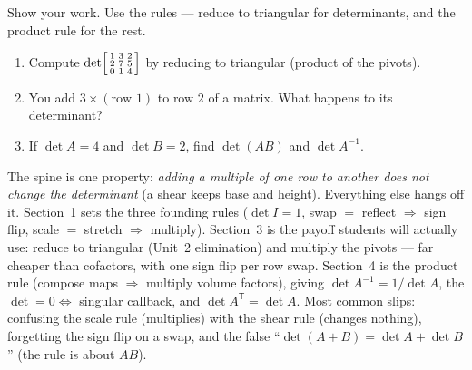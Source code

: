 \documentclass[10pt]{article}
\newcommand{\T}{\mathsf{T}}
\begin{document}
\begin{practicebox}
Show your work. Use the rules --- reduce to triangular for determinants, and the product rule for the rest.
\begin{enumerate}[leftmargin=1.6em, itemsep=6pt]
  \item Compute $\det\begin{bsmallmatrix} 1 & 3 & 2 \\ 2 & 7 & 5 \\ 0 & 1 & 4 \end{bsmallmatrix}$ by reducing to triangular (product of the pivots). 
  \item You add $3\times(\text{row }1)$ to row $2$ of a matrix. What happens to its determinant? 
  \item If $\det A=4$ and $\det B=2$, find $\det(AB)$ and $\det A^{-1}$. 
\end{enumerate}
\end{practicebox}

\begin{teachernote}
The spine is one property: \emph{adding a multiple of one row to another does not change the
determinant} (a shear keeps base and height). Everything else hangs off it. Section~1 sets the three
founding rules ($\det I=1$, swap $=$ reflect $\Rightarrow$ sign flip, scale $=$ stretch $\Rightarrow$
multiply). Section~3 is the payoff students will actually use: reduce to triangular (Unit~2
elimination) and multiply the pivots --- far cheaper than cofactors, with one sign flip per row swap.
Section~4 is the product rule (compose maps $\Rightarrow$ multiply volume factors), giving
$\det A^{-1}=1/\det A$, the $\det=0\Leftrightarrow$ singular callback, and $\det A^{\T}=\det A$. Most
common slips: confusing the scale rule (multiplies) with the shear rule (changes nothing), forgetting
the sign flip on a swap, and the false ``$\det(A+B)=\det A+\det B$'' (the rule is about $AB$).
\end{teachernote}
\end{document}

